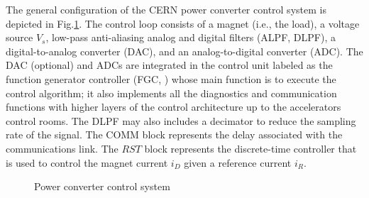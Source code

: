 \documentclass[journal]{IEEEtran}
\begin{document}
The general configuration of the CERN power converter control system is depicted in Fig.\ref{fig:ident_block}. The control loop consists of a magnet (i.e., the load), a voltage source $V_s$, low-pass anti-aliasing analog and digital filters (ALPF, DLPF), a digital-to-analog converter (DAC), and an analog-to-digital converter (ADC). The DAC (optional) and ADCs are integrated in the control unit labeled as the function generator controller (FGC, \cite{CKS11}) whose main function is to execute the control algorithm; it also implements all the diagnostics and communication functions with higher layers of the control architecture up to the accelerators control rooms. The DLPF may also includes a decimator to reduce the sampling rate of the signal. The COMM block represents the delay associated with the communications link. The $RST$ block represents the discrete-time controller that is used to control the magnet current $i_D$ given a reference current $i_R$. 
 



\begin{figure}
\centering
\resizebox{1\columnwidth}{!}{}
\caption{Power converter control system}
\label{fig:ident_block}
\end{figure}


\end{document}
